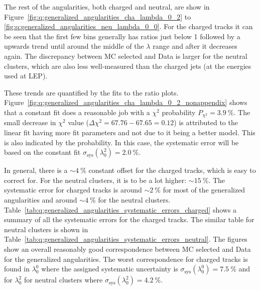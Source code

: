 The rest of the angularities, both charged and neutral, are show in Figure~\ref{fig:q:generalized_angularities_cha_lambda_0_2} to \ref{fig:q:generalized_angularities_neu_lambda_0_0}. For the charged tracks it can be seen that the first few bins generally has ratios just below \num{1} followed by a upwards trend until around the middle of the $\lambda$ range and after it decreases again. The discrepancy between MC selected and Data is larger for the neutral clusters, which are also less well-measured than the charged jets (at the energies used at LEP). 

These trends are quantified by the fits to the ratio plots. Figure~\ref{fig:q:generalized_angularities_cha_lambda_0_2_nonappendix} shows that a constant fit does a reasonable job with a $\chi^2$ probability $P_{\chi^2}=\SI{3.9}{\percent}$. The small decrease in $\chi^2$ value ($\Delta \chi^2 = 67.76-67.65=0.12$) is attributed to the linear fit having more fit parameters and not due to it being a better model. This is also indicated by the probability. In this case, the systematic error will be based on the constant fit $\sigma_\mathrm{sys}(\lambda_0^2)=\SI{2.0}{\percent}$. 

In general, there is a ${\sim}\SI{4}{\percent}$ constant offset for the charged tracks, which is easy to correct for. For the neutral clusters, it is to be a lot higher: ${\sim} \SI{15}{\percent}$. The systematic error for charged tracks is around ${\sim} \SI{2}{\percent}$ for most of the generalized angularities and around ${\sim} \SI{4}{\percent}$ for the neutral clusters. Table~\ref{tab:q:generalized_angularities_systematic_errors_charged} shows a summary of all the systematic errors for the charged tracks. The similar table for neutral clusters is shown in Table~\ref{tab:q:generalized_angularities_systematic_errors_neutral}. The figures show an overall reasonably good correspondence between MC selected and Data for the generalized angularities. The worst correspondence for charged tracks is found in $\lambda_0^0$ where the assigned systematic uncertainty is $\sigma_\mathrm{sys}(\lambda_0^0)= \SI{7.5}{\percent}$ and for $\lambda_0^2$ for neutral clusters where $\sigma_\mathrm{sys}(\lambda_0^2)= \SI{4.2}{\percent}$.


